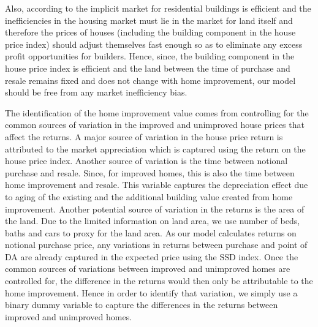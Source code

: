 \documentclass[AEJ,reqno, draftmode]{AEA} %
\begin{document}
Also, according to \citet{rosenthal1999residential} the implicit market for residential buildings is efficient and the inefficiencies in the housing market must lie in the market for land itself and therefore the prices of houses (including the building component in the house price index) should adjust themselves fast enough so as to eliminate any excess profit opportunities for builders. Hence, since, the building component in the house price index is efficient and the land between the time of purchase and resale remains fixed and does not change with home improvement, our model should be free from any market inefficiency bias.

The identification of the home improvement value comes from controlling for the common sources of variation in the improved and unimproved house prices that affect the returns. A major source of variation in the house price return is attributed to the market appreciation which is captured using the return on the house price index. Another source of variation is the time between notional purchase and resale. Since, for improved homes, this is also the time between home improvement and resale. This variable captures the depreciation effect due to aging of the existing and the additional building value created from home improvement. Another potential source of variation in the returns is the area of the land. Due to the limited information on land area, we use number of beds, baths and cars to proxy for the land area. As our model calculates returns on notional purchase price, any variations in returns between purchase and point of DA are already captured in the expected price using the SSD index. Once the common sources of variations between improved and unimproved homes are controlled for, the difference in the returns would then only be attributable to the home improvement. Hence in order to identify that variation, we simply use a binary dummy variable to capture the differences in the returns between improved and unimproved homes.
\end{document}
